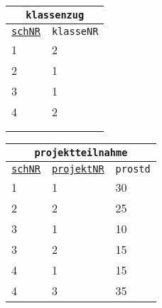 \begin{Answer}[ref=Normal0]
\begin{minipage}{\textwidth}
\begin{minipage}{0.33\textwidth}
\begin{tabular}{ll}
				\multicolumn{2}{c}{\lstinline!klassenzug!}\\
				\hline
				\underline{\lstinline!schNR!}&\lstinline!klasseNR!\\
				\hline
				1&2\\
				2&1\\
				3&1\\
				4&2\\
				\phantom{text}&\\
				\phantom{text}&\\
			\end{tabular}
		\end{minipage}
		\begin{minipage}{0.66\textwidth}
			\begin{tabular}{lll}
				\multicolumn{3}{c}{\lstinline!projektteilnahme!}\\
				\hline
				\underline{\lstinline!schNR!}&\underline{\lstinline!projektNR!}&\lstinline!prostd!\\
				\hline
				1&1&30\\
				2&2&25\\
				3&1&10\\
				3&2&15\\
				4&1&15\\
				4&3&35\\
			\end{tabular}
		\end{minipage}
	\end{minipage}
\end{Answer}
